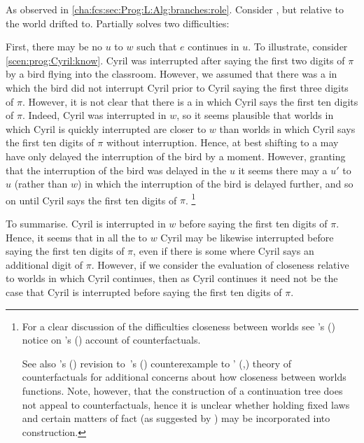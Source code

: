 \begin{note}
  As observed in \autoref{cha:fcs:sec:Prog:L:Alg:branches:role}.
  Consider , but  relative to the world drifted to.
  Partially solves two difficulties:

  First, there may be no  \(u\) to \(w\) such that \(e\) continues in \(u\).
  To illustrate, consider \autoref{scen:prog:Cyril:know}.
  Cyril was interrupted after saying the first two digits of \(\pi\) by a bird flying into the classroom.
  However, we assumed that there was a  in which the bird did not interrupt Cyril prior to Cyril saying the first three digits of \(\pi\).
  However, it is not clear that there is a  in which Cyril says the first ten digits of \(\pi\).
  Indeed, Cyril was interrupted in \(w\), so it seems plausible that worlds in which Cyril is quickly interrupted are closer to \(w\) than worlds in which Cyril says the first ten digits of \(\pi\) without interruption.
  Hence, at best shifting to a  may have only delayed the interruption of the bird by a moment.
  However, granting that the interruption of the bird was delayed in the  \(u\) it seems there may a  \(u'\) to \(u\) (rather than \(w\)) in which the interruption of the bird is delayed further, and so on until Cyril says the first ten digits of \(\pi\).%
  \footnote{
    For a clear discussion of the difficulties closeness between worlds see \citeauthor{Fine:1975tj}'s (\citeyear{Fine:1975tj}) notice on \citeauthor{Lewis:1973th}'s (\citeyear{Lewis:1973th}) account of counterfactuals.

    See also \citeauthor{Veltman:2005tj}'s (\citeyear{Veltman:2005tj}) revision to~\citeauthor{Tichy:1976tp}'s (\citeyear{Tichy:1976tp}) counterexample to \citeauthor{Lewis:1979vm}' (\citeyear{Lewis:1973th},\citeyear{Lewis:1979vm}) theory of counterfactuals for additional concerns about how closeness between worlds functions.
    Note, however, that the construction of a continuation tree does not appeal to counterfactuals, hence it is unclear whether holding  fixed laws and certain matters of fact (as suggested by \citeauthor{Veltman:2005tj}) may be incorporated into construction.
  }

  To summarise.
  Cyril is interrupted in \(w\) before saying the first ten digits of \(\pi\).
  Hence, it seems that in all the  to \(w\) Cyril may be likewise interrupted before saying the first ten digits of \(\pi\), even if there is some \closeW{} where Cyril says an additional digit of \(\pi\).
  However, if we consider the evaluation of closeness relative to worlds in which Cyril continues, then as Cyril continues it need not be the case that Cyril is interrupted before saying the first ten digits of \(\pi\).
\end{note}


